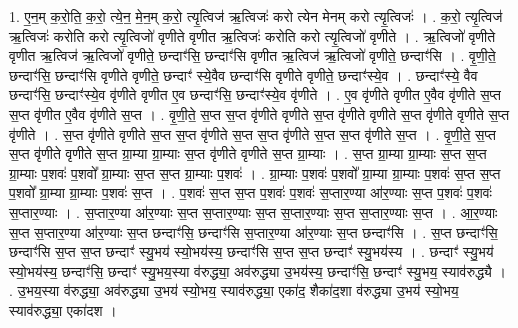 \documentclass[17pt]{extarticle}
\begin{document}
1. ए॒न॒म् क॒रो॒ति॒ क॒रो॒ त्ये॒न॒ मे॒न॒म् क॒रो॒ त्यृ॒त्विज॑ ऋ॒त्विजः॑ करो त्येन मेनम् करो त्यृ॒त्विजः॑ । . क॒रो॒ त्यृ॒त्विज॑ ऋ॒त्विजः॑ करोति करो त्यृ॒त्विजो॑ वृणीते वृणीत ऋ॒त्विजः॑ करोति करो त्यृ॒त्विजो॑ वृणीते । . ऋ॒त्विजो॑ वृणीते वृणीत ऋ॒त्विज॑ ऋ॒त्विजो॑ वृणीते॒ छन्दाꣳ॑सि॒ छन्दाꣳ॑सि वृणीत ऋ॒त्विज॑ ऋ॒त्विजो॑ वृणीते॒ छन्दाꣳ॑सि । . वृ॒णी॒ते॒ छन्दाꣳ॑सि॒ छन्दाꣳ॑सि वृणीते वृणीते॒ छन्दाꣳ॑ स्ये॒वैव छन्दाꣳ॑सि वृणीते वृणीते॒ छन्दाꣳ॑स्ये॒व । . छन्दाꣳ॑स्ये॒ वैव छन्दाꣳ॑सि॒ छन्दाꣳ॑स्ये॒व वृ॑णीते वृणीत ए॒व छन्दाꣳ॑सि॒ छन्दाꣳ॑स्ये॒व वृ॑णीते । . ए॒व वृ॑णीते वृणीत ए॒वैव वृ॑णीते स॒प्त स॒प्त वृ॑णीत ए॒वैव वृ॑णीते स॒प्त । . वृ॒णी॒ते॒ स॒प्त स॒प्त वृ॑णीते वृणीते स॒प्त वृ॑णीते वृणीते स॒प्त वृ॑णीते वृणीते स॒प्त वृ॑णीते । . स॒प्त वृ॑णीते वृणीते स॒प्त स॒प्त वृ॑णीते स॒प्त स॒प्त वृ॑णीते स॒प्त स॒प्त वृ॑णीते स॒प्त । . वृ॒णी॒ते॒ स॒प्त स॒प्त वृ॑णीते वृणीते स॒प्त ग्रा॒म्या ग्रा॒म्याः स॒प्त वृ॑णीते वृणीते स॒प्त ग्रा॒म्याः । . स॒प्त ग्रा॒म्या ग्रा॒म्याः स॒प्त स॒प्त ग्रा॒म्याः प॒शवः॑ प॒शवो᳚ ग्रा॒म्याः स॒प्त स॒प्त ग्रा॒म्याः प॒शवः॑ । . ग्रा॒म्याः प॒शवः॑ प॒शवो᳚ ग्रा॒म्या ग्रा॒म्याः प॒शवः॑ स॒प्त स॒प्त प॒शवो᳚ ग्रा॒म्या ग्रा॒म्याः प॒शवः॑ स॒प्त । . प॒शवः॑ स॒प्त स॒प्त प॒शवः॑ प॒शवः॑ स॒प्तार॒ण्या आ॑र॒ण्याः स॒प्त प॒शवः॑ प॒शवः॑ स॒प्तार॒ण्याः । . स॒प्तार॒ण्या आ॑र॒ण्याः स॒प्त स॒प्तार॒ण्याः स॒प्त स॒प्तार॒ण्याः स॒प्त स॒प्तार॒ण्याः स॒प्त । . आ॒र॒ण्याः स॒प्त स॒प्तार॒ण्या आ॑र॒ण्याः स॒प्त छन्दाꣳ॑सि॒ छन्दाꣳ॑सि स॒प्तार॒ण्या आ॑र॒ण्याः स॒प्त छन्दाꣳ॑सि । . स॒प्त छन्दाꣳ॑सि॒ छन्दाꣳ॑सि स॒प्त स॒प्त छन्दाꣳ॑ स्यु॒भय॑ स्यो॒भय॑स्य॒ छन्दाꣳ॑सि स॒प्त स॒प्त छन्दाꣳ॑ स्यु॒भय॑स्य । . छन्दाꣳ॑ स्यु॒भय॑ स्यो॒भय॑स्य॒ छन्दाꣳ॑सि॒ छन्दाꣳ॑ स्यु॒भय॒स्या व॑रुद्ध्या॒ अव॑रुद्ध्या उ॒भय॑स्य॒ छन्दाꣳ॑सि॒ छन्दाꣳ॑ स्यु॒भय॒ स्याव॑रुद्ध्यै । . उ॒भय॒स्या व॑रुद्ध्या॒ अव॑रुद्ध्या उ॒भय॑ स्यो॒भय॒ स्याव॑रुद्ध्या॒ एका॑द॒ शैका॑द॒शा व॑रुद्ध्या उ॒भय॑ स्यो॒भय॒ स्याव॑रुद्ध्या॒ एका॑दश । \newline
\end{document}
